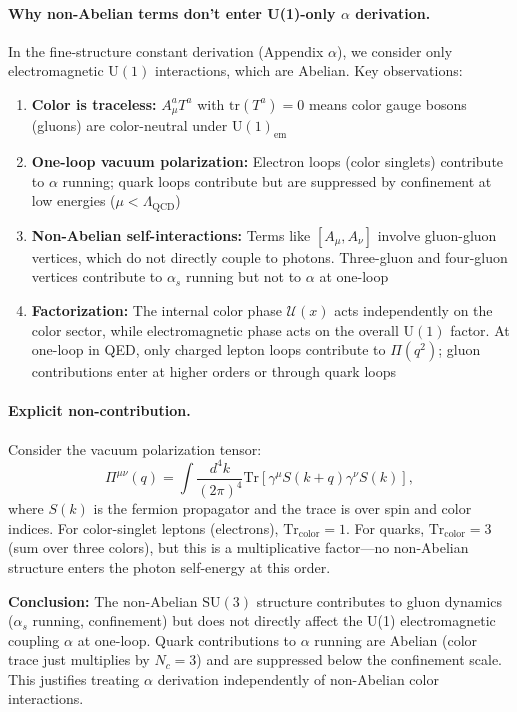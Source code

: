 \paragraph{Why non-Abelian terms don't enter U(1)-only $\alpha$ derivation.} In the fine-structure constant derivation (Appendix $\alpha$), we consider only electromagnetic $\mathrm{U}(1)$ interactions, which are Abelian. Key observations:
\begin{enumerate}
\item \textbf{Color is traceless:} $A_\mu^a T^a$ with $\mathrm{tr}(T^a) = 0$ means color gauge bosons (gluons) are color-neutral under $\mathrm{U}(1)_{\text{em}}$
\item \textbf{One-loop vacuum polarization:} Electron loops (color singlets) contribute to $\alpha$ running; quark loops contribute but are suppressed by confinement at low energies ($\mu < \Lambda_{\mathrm{QCD}}$)
\item \textbf{Non-Abelian self-interactions:} Terms like $[A_\mu, A_\nu]$ involve gluon-gluon vertices, which do not directly couple to photons. Three-gluon and four-gluon vertices contribute to $\alpha_s$ running but not to $\alpha$ at one-loop
\item \textbf{Factorization:} The internal color phase $\mathcal{U}(x)$ acts independently on the color sector, while electromagnetic phase acts on the overall $\mathrm{U}(1)$ factor. At one-loop in QED, only charged lepton loops contribute to $\Pi(q^2)$; gluon contributions enter at higher orders or through quark loops
\end{enumerate}

\paragraph{Explicit non-contribution.} Consider the vacuum polarization tensor:
\begin{equation}
\Pi^{\mu\nu}(q) = \int \frac{d^4k}{(2\pi)^4} \mathrm{Tr}\left[\gamma^\mu S(k+q) \gamma^\nu S(k)\right],
\label{eq:Pi-trace}
\end{equation}
where $S(k)$ is the fermion propagator and the trace is over spin and color indices. For color-singlet leptons (electrons), $\mathrm{Tr}_{\text{color}} = 1$. For quarks, $\mathrm{Tr}_{\text{color}} = 3$ (sum over three colors), but this is a multiplicative factor—no non-Abelian structure enters the photon self-energy at this order.

\textbf{Conclusion:} The non-Abelian $\mathrm{SU}(3)$ structure contributes to gluon dynamics ($\alpha_s$ running, confinement) but does not directly affect the U(1) electromagnetic coupling $\alpha$ at one-loop. Quark contributions to $\alpha$ running are Abelian (color trace just multiplies by $N_c = 3$) and are suppressed below the confinement scale. This justifies treating $\alpha$ derivation independently of non-Abelian color interactions.

